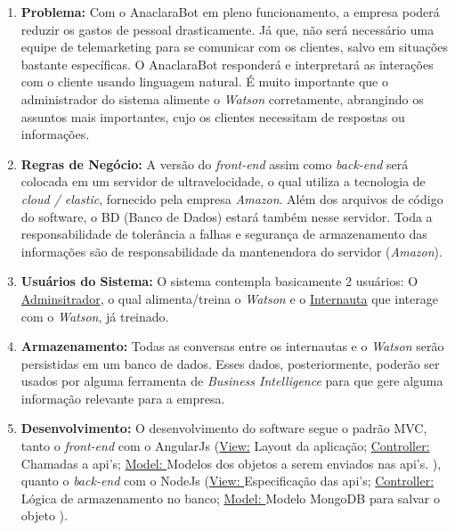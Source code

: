 \begin{enumerate}
\item \textbf{Problema:} Com o AnaclaraBot em pleno funcionamento, a empresa poderá reduzir os gastos de pessoal drasticamente. Já que, não será necessário uma equipe de telemarketing para se comunicar com os clientes, salvo em situações bastante específicas. O AnaclaraBot responderá e interpretará as interações com o cliente usando linguagem natural. É muito importante que o administrador do sistema alimente o \emph{Watson} corretamente, abrangindo os assuntos mais importantes, cujo os clientes necessitam de respostas ou informações.

\item \textbf{Regras de Negócio:} A versão do \emph{front-end} assim como \emph{back-end} será colocada em um servidor de ultravelocidade, o qual utiliza a tecnologia de \emph{cloud / elastic}, fornecido pela empresa \emph{Amazon}. Além dos arquivos de código do software, o BD (Banco de Dados) estará também nesse servidor. Toda a responsabilidade de tolerância a falhas e segurança de armazenamento das informações são de responsabilidade da mantenendora do servidor (\emph{Amazon}).

\item \textbf{Usuários do Sistema:} O sistema contempla basicamente 2 usuários: O \underline{Adminsitrador}, o qual alimenta/treina o \emph{Watson} e o \underline{Internauta} que interage com o \emph{Watson}, já treinado.

\item \textbf{Armazenamento:} Todas as conversas entre os internautas e o \emph{Watson} serão persistidas em um banco de dados. Esses dados, posteriormente, poderão ser usados por alguma ferramenta de \emph{Business Intelligence } para que gere alguma informação relevante para a empresa.

\item \textbf{Desenvolvimento:} O desenvolvimento do software segue o padrão MVC, tanto o \textit{front-end} com o AngularJs (\underline{View:} Layout da aplicação;  \underline{Controller:} Chamadas a api's; \underline{Model: } Modelos dos objetos a serem enviados nas api's. ), quanto o \textit{back-end} com o NodeJs (\underline{View: } Especificação das api's; \underline{Controller:} Lógica de armazenamento no banco; \underline{Model: } Modelo MongoDB para salvar o objeto ).
\end{enumerate}
